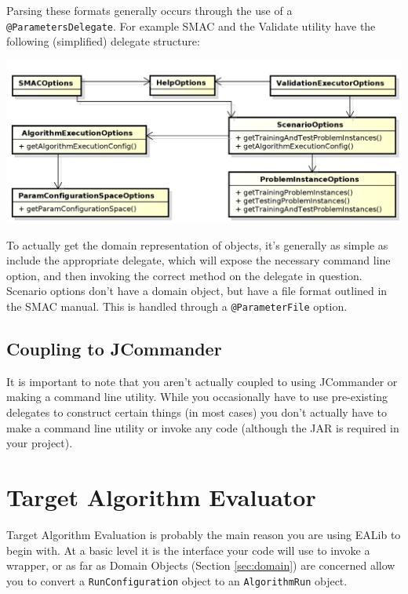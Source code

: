 \documentclass[11pt,letterpaper,oneside]{article}
\begin{document}
Parsing these formats generally occurs through the use of a \texttt{@ParametersDelegate}. For example SMAC and the Validate utility have the following (simplified) delegate structure:

\begin{center}
\includegraphics[scale=0.75]{img/UML/Options2.png}
\end{center}


To actually get the domain representation of objects, it's generally as simple as include the appropriate delegate, which will expose the necessary command line option, and then invoking the correct method on the delegate in question. Scenario options don't have a domain object, but have a file format outlined in the SMAC manual. This is handled through a \texttt{@ParameterFile} option.

\subsection{Coupling to JCommander}

It is important to note that you aren't actually coupled to using JCommander or making a command line utility. While you occasionally have to use pre-existing delegates to construct certain things (in most cases) you don't actually have to make a command line utility or invoke any code (although the JAR is required in your project).


\section{Target Algorithm Evaluator}
\label{sec:tae}
Target Algorithm Evaluation is probably the main reason you are using EALib to begin with. At a basic level it is the interface your code will use to invoke a wrapper, or as far as Domain Objects (Section \ref{sec:domain}) are concerned allow you to convert a \texttt{RunConfiguration} object to an \texttt{AlgorithmRun} object.
\end{document}
